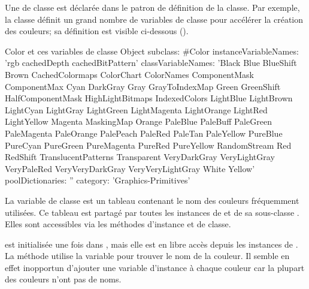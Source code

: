 \documentclass[a4paper,10pt,twoside]{book}
\begin{document}

Une  de classe est déclarée dans le patron de définition de la classe.
Par exemple, la classe  définit un grand nombre de variables de classe pour accélérer la création des couleurs;
sa définition est visible ci-dessous ().

\begin{classdef}[Color]{Color et ces variables de classe}
Object subclass: #Color 	
        instanceVariableNames: 'rgb cachedDepth cachedBitPattern'
        classVariableNames: 'Black Blue BlueShift Brown CachedColormaps ColorChart ColorNames ComponentMask ComponentMax Cyan DarkGray Gray GrayToIndexMap Green GreenShift HalfComponentMask HighLightBitmaps IndexedColors LightBlue LightBrown LightCyan LightGray LightGreen LightMagenta LightOrange LightRed LightYellow Magenta MaskingMap Orange PaleBlue PaleBuff PaleGreen PaleMagenta PaleOrange PalePeach PaleRed PaleTan PaleYellow PureBlue PureCyan PureGreen PureMagenta PureRed PureYellow RandomStream Red RedShift TranslucentPatterns Transparent VeryDarkGray VeryLightGray VeryPaleRed VeryVeryDarkGray VeryVeryLightGray White Yellow'
        poolDictionaries: '' 	
        category: 'Graphics-Primitives'
\end{classdef}

La variable de classe  est un tableau contenant le nom des couleurs fréquemment utilisées. Ce tableau est partagé par toutes les instances de  et de sa sous-classe . 
Elles sont accessibles via les méthodes d'instance et de classe.


 est initialisée une fois dans , mais elle est en libre accès depuis les instances de .
La méthode  utilise la variable pour trouver
le nom de la couleur.
Il semble en effet inopportun d'ajouter une variable d'instance 
à chaque couleur car la plupart des couleurs n'ont pas de noms.
 
\end{document}
